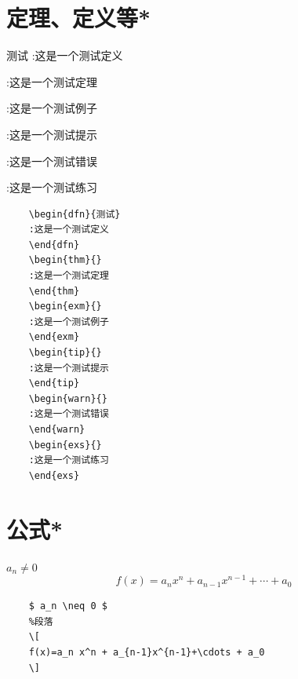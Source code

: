 \documentclass{ctexart}
\begin{document}
\newpage
\section{定理、定义等*}

    \begin{dfn}{测试}
    :这是一个测试定义
    \end{dfn}
    \begin{thm}{}
    :这是一个测试定理
    \end{thm}
    \begin{exm}{}
    :这是一个测试例子
    \end{exm}
    \begin{tip}{}   
    :这是一个测试提示
    \end{tip}
    \begin{warn}{}
    :这是一个测试错误
    \end{warn}
    \begin{exs}{}
    :这是一个测试练习
    \end{exs}
\begin{lstlisting}[language={[LaTeX]TeX}]
    % 在环境内容开始前加一个字符就正常显示，不然会吞掉一个字符
    \begin{dfn}{测试}
    :这是一个测试定义
    \end{dfn}
    \begin{thm}{}
    :这是一个测试定理
    \end{thm}
    \begin{exm}{}
    :这是一个测试例子
    \end{exm}
    \begin{tip}{}   
    :这是一个测试提示
    \end{tip}
    \begin{warn}{}
    :这是一个测试错误
    \end{warn}
    \begin{exs}{}
    :这是一个测试练习
    \end{exs}
\end{lstlisting}
\newpage
\section{公式*}
$ a_n \neq 0 $
\[
f(x)=a_n x^n + a_{n-1}x^{n-1}+\cdots + a_0
\]
\begin{lstlisting}[language={[LaTeX]TeX}]
    %行内
    $ a_n \neq 0 $
    %段落
    \[
    f(x)=a_n x^n + a_{n-1}x^{n-1}+\cdots + a_0
    \]
\end{lstlisting}
\end{document}
